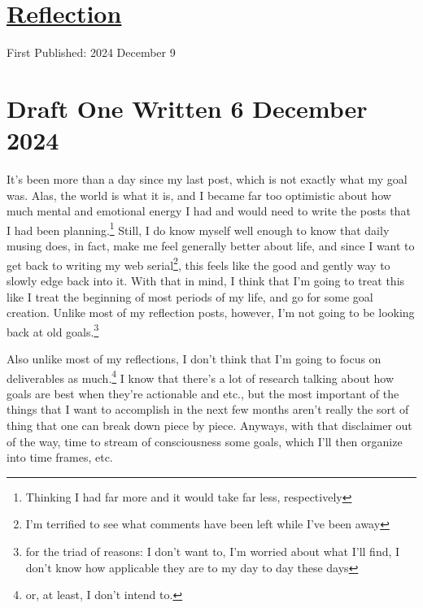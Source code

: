 \documentclass[12pt]{article}[titlepage]
\renewcommand{\,}{\textsuperscript{,}}
\begin{document}
\doublespacing
\section{\href{reflection-2024b.html}{Reflection}}
First Published: 2024 December 9

\section{Draft One Written 6 December 2024}

It's been more than a day since my last post, which is not exactly what my goal was.  
Alas, the world is what it is, and I became far too optimistic about how much mental and emotional energy I had and would need to write the posts that I had been planning.\footnote{Thinking I had far more and it would take far less, respectively}  
Still, I do know myself well enough to know that daily musing does, in fact, make me feel generally better about life, and since I want to get back to writing my web serial\footnote{I'm terrified to see what comments have been left while I've been away}, this feels like the good and gently way to slowly edge back into it.  
With that in mind, I think that I'm going to treat this like I treat the beginning of most periods of my life, and go for some goal creation.  
Unlike most of my reflection posts, however, I'm not going to be looking back at old goals.\footnote{for the triad of reasons: I don't want to, I'm worried about what I'll find, I don't know how applicable they are to my day to day these days}

Also unlike most of my reflections, I don't think that I'm going to focus on deliverables as much.\footnote{or, at least, I don't intend to.}  
I know that there's a lot of research talking about how goals are best when they're actionable and etc., but the most important of the things that I want to accomplish in the next few months aren't really the sort of thing that one can break down piece by piece.  
Anyways, with that disclaimer out of the way, time to stream of consciousness some goals, which I'll then organize into time frames, etc.
\end{document}
